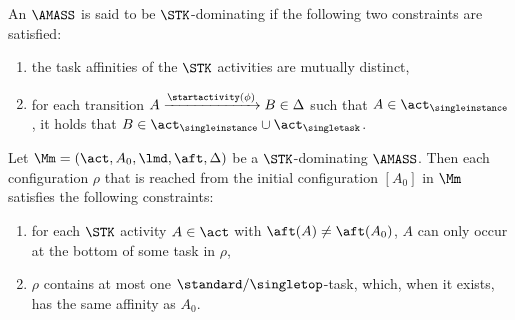 \begin{definition} \label{def:stk-amass}
    An $\AMASS$ is said to be $\STK$-dominating if the following two constraints are satisfied:
    \begin{enumerate}
        \item the task affinities of the $\STK$ activities are mutually distinct,
        \item for each transition $A \xrightarrow{\startactivity(\phi)} B\in\Delta$ such that $A\in\act_{\singleinstance}$, it holds that $B\in\act_{\singleinstance}\cup\act_{\singletask}$.
    \end{enumerate}
\end{definition}

\begin{proposition}\label{prop-stk}
    Let $\Mm=(\act,A_0,\lmd,\aft,\Delta)$ be a $\STK$-dominating $\AMASS$. Then each configuration $\rho$ that is reached from the initial configuration $[A_0]$ in $\Mm$ satisfies the following constraints:
    \begin{enumerate}
        \item for each $\STK$ activity $A\in\act$ with $\aft(A)\neq\aft(A_0)$, $A$ can only occur at the bottom of some task in $\rho$, 
        \item $\rho$ contains at most one $\standard/\singletop$-task, which, when it exists, has the same affinity as $A_0$.
    \end{enumerate}
\end{proposition}




